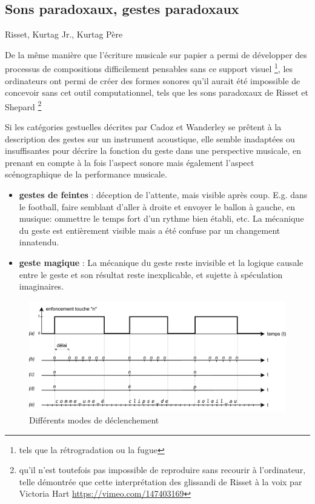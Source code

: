 \subsection{Sons paradoxaux, gestes paradoxaux}
Risset, Kurtag Jr., Kurtag Père

De la même manière que l'écriture musicale sur papier a permi de développer des processus de compositions difficilement pensables sans ce support visuel \footnote{tels que la rétrogradation ou la fugue}, les ordinateurs ont permi de créer des formes sonores qu'il aurait été impossible de concevoir sans cet outil computationnel, tels que les sons paradoxaux de Risset et Shepard \footnote{qu'il n'est toutefois pas impossible de reproduire sans recourir à l'ordinateur, telle démontrée que cette interprétation des glissandi de Risset à la voix par Victoria Hart \url{https://vimeo.com/147403169}}

Si les catégories gestuelles décrites par Cadoz et Wanderley se prêtent à la description des gestes sur un instrument acoustique, elle semble inadaptées ou insuffisantes pour décrire la fonction du geste dans une perspective musicale, en prenant en compte à la fois l'aspect sonore mais également l'aspect scénographique de la performance musicale.

\vspace{-1em}
\begin{itemize}[noitemsep]
\item \textbf{gestes de feintes} : déception de l'attente, mais visible après coup. E.g. dans le football, faire semblant d'aller à droite et envoyer le ballon à gauche, en musique: ommettre le temps fort d'un rythme bien établi, etc. La mécanique du geste est entièrement visible mais a été confuse par un changement innatendu.
\item \textbf{geste magique} : La mécanique du geste reste invisible et la logique causale entre le geste et son résultat reste inexplicable, et sujette à spéculation imaginaires.
\end{itemize}


\begin{figure}[!htbp]
	\includegraphics[width=\textwidth]{gfx/03_gesture/key_modes.pdf}
	\caption{Différents modes de déclenchement}
	\label{fig:gesture:triggering_modes}
\end{figure}


